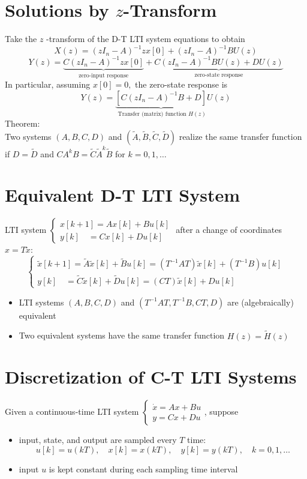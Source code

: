 \documentclass[10pt,a4paper,oneside]{article}
\begin{document}
\section{Solutions by $z$-Transform}
Take the $z$ -transform of the D-T LTI system equations to obtain
\[
X(z)=\left(z I_{n}-A\right)^{-1} z x[0]+\left(z I_{n}-A\right)^{-1} B U(z)
\]
\[
Y(z)=\underbrace{C\left(z I_{n}-A\right)^{-1} z x[0]}_{\text { zero-input response }}+\underbrace{C\left(zI_{n}-A\right)^{-1} B U(z)+D U(z)}_{\text { zero-state response }}
\]
In particular, assuming $x[0]=0,$ the zero-state response is
\[
Y(z)=\underbrace{\left[C\left(z I_{n}-A\right)^{-1} B+D\right]}_{\text { Transfer (matrix) function } H(z)} U(z)
\]
Theorem:\\
Two systems $(A, B, C, D)$ and $(\tilde{A}, \tilde{B}, \tilde{C}, \tilde{D})$ realize the same transfer function if $D=\tilde{D}$ and $C A^{k} B=\tilde{C} \tilde{A}^{k} \tilde{B}$ for $k=0,1, \ldots$
\section{Equivalent D-T LTI System}
LTI system $\left\{\begin{array}{l}{x[k+1]=A x[k]+B u[k]} \\ {y[k] \quad=C x[k]+D u[k]}\end{array}\right.$ after a change of coordinates $x=T\tilde{x}$:
\[
\left\{\begin{array}{l}{\tilde{x}[k+1]=\tilde{A} \tilde{x}[k]+\tilde{B} u[k]=\left(T^{-1} A T\right) \tilde{x}[k]+\left(T^{-1} B\right) u[k]} \\ {y[k] \quad=\tilde{C} \tilde{x}[k]+\tilde{D} u[k]=(C T) \tilde{x}[k]+D u[k]}\end{array}\right.
\]
\begin{itemize}
\item LTI systems $(A, B, C, D)$ and $\left(T^{-1} A T, T^{-1} B, C T, D\right)$ are
(algebraically) equivalent
\item Two equivalent systems have the same transfer function $H(z)=\tilde{H}(z)$
\end{itemize}
\section{Discretization of C-T LTI Systems}
Given a continuous-time LTI system $\left\{\begin{array}{l}{\dot{x}=A x+B u} \\ {y=C x+D u}\end{array}\right.$, suppose
\begin{itemize}
\item input, state, and output are sampled every $T$ time:
\[
u[k]=u(k T), \quad x[k]=x(k T), \quad y[k]=y(k T), \quad k=0,1, \ldots
\]
\item input $u$ is kept constant during each sampling time interval
\end{itemize}
\end{document}
